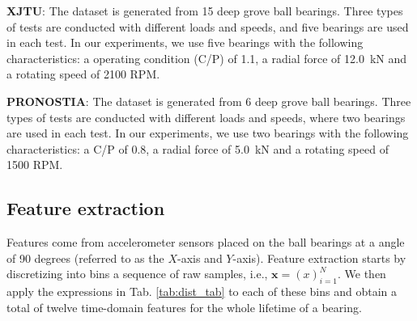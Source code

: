 \documentclass[letterpaper]{article} %
\begin{document}
\textbf{XJTU}: The dataset is generated from 15 deep grove ball bearings. Three types of tests are conducted with different loads and speeds, and five bearings are used in each test. In our experiments, we use five bearings with the following characteristics: a operating condition (C/P) of 1.1, a radial force of 12.0~kN and a rotating speed of 2100 RPM.

\textbf{PRONOSTIA}: The dataset is generated from 6 deep grove ball bearings. Three types of tests are conducted with different loads and speeds, where two bearings are used in each test. In our experiments, we use two bearings with the following characteristics: a C/P of 0.8, a radial force of 5.0~kN and a rotating speed of 1500 RPM.

\subsection{Feature extraction}

Features come from accelerometer sensors placed on the ball bearings at a angle of 90 degrees (referred to as the $X$-axis and $Y$-axis). Feature extraction starts by discretizing into bins a sequence of raw samples, i.e., $\bm{x} = (x)_{i=1}^N$. We then apply the expressions in Tab. \ref{tab:dist_tab} to each of these bins and obtain a total of twelve time-domain features for the whole lifetime of a bearing.


\end{document}
